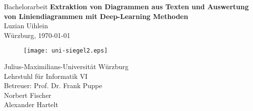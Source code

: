 \begin{titlepage}
    \centering \mbox{}
    \large Bachelorarbeit \vfill  \Huge \textbf{Extraktion von Diagrammen aus Texten und Auswertung von Liniendiagrammen mit Deep-Learning Methoden} \\ \vfill \vfill \Large Luzian Uihlein \\ \vfill Würzburg, \today \\ \vfill \begin{figure}[h!] \begin{center} \texttt{[image: uni-siegel2.eps]}
        \end{center}
    \end{figure}

    Julius-Maximilians-Universität Würzburg \\
    Lehrstuhl für Informatik \RN{6}\\
    Betreuer: Prof. Dr. Frank Puppe\\
    \phantom{Betreuer: }Norbert Fischer\phantom{aaaaaa}\\
    \phantom{Betreuer: }Alexander Hartelt\phantom{aaaa}
\end{titlepage}

\thispagestyle{empty}
\cleardoublepage

